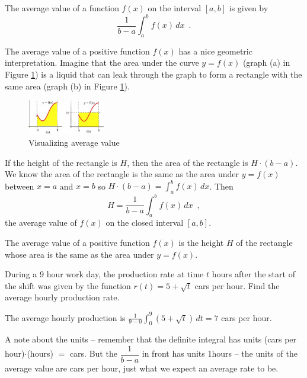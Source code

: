 \begin{definition}
The average value of a function $f(x)$ on the interval $[a,b]$ is given by
$$\frac{1}{b-a}\int_a^b f(x)\,dx \enspace .$$
\end{definition}

The average value of a positive function $f(x)$ has a nice geometric interpretation. Imagine that the area under the curve $y=f(x)$ (graph (a) in Figure \ref{fig:5-8-liquid}) is a liquid that can leak through the graph to form a rectangle with the same area (graph (b) in Figure \ref{fig:5-8-liquid}).

\begin{figure}[!ht]
  \centering
    \includegraphics[width=0.3\textwidth]{img/chap5/image053.png}
    \caption{Visualizing average value}
    \label{fig:5-8-liquid}
\end{figure}

If the height of the rectangle is $H$, then the area of the rectangle is $H\cdot(b-a)$. We know the area of the rectangle is the same as the area under $y=f(x)$ between $x=a$ and $x=b$ so $H\cdot(b-a)=\int_a^b f(x)\,dx$. Then
$$H = \frac{1}{b-a}\int_a^bf(x)\,dx\enspace ,$$
the average value of $f(x)$ on the closed interval $[a,b]$.

The average value of a positive function $f(x)$ is the height $H$ of the rectangle whose area is the same as the area under $y=f(x)$.

\begin{example}
During a 9 hour work day, the production rate at time $t$ hours after the start of the shift was given by the function $r(t)=5+\sqrt{t}$ cars per hour. Find the average hourly production rate.

\begin{solution}
The average hourly production is $\displaystyle\frac{1}{9-0}\displaystyle\int_0^9\left(5+\sqrt{t}\right)\,dt=7$ cars per hour.
\end{solution}\end{example}

A note about the units -- remember that the definite integral has units (cars per hour)$\cdot$(hours) $=$ cars. But the $\dfrac{1}{b-a}$ in front has units 1hours -- the units of the average value are cars per hour, just what we expect an average rate to be.

